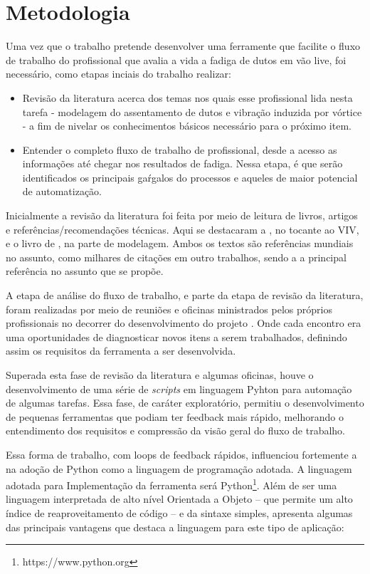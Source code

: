 \chapter{Metodologia}\label{chap:metodologia}


Uma vez que o trabalho pretende desenvolver uma ferramente que facilite o fluxo de trabalho do profissional que avalia a vida a fadiga de dutos em vão live, foi necessário, como etapas inciais do trabalho realizar:

\begin{itemize}
    \item Revisão da literatura acerca dos temas nos quais esse profissional lida nesta tarefa - modelagem do assentamento de dutos e vibração induzida por vórtice - a fim de nivelar os conhecimentos básicos necessário para o próximo item.
    \item Entender o completo fluxo de trabalho de profissional, desde a acesso as informações até chegar nos resultados de fadiga. Nessa etapa, é que serão identificados os principais gaŕgalos do processos e aqueles de maior potencial de automatização.
\end{itemize}

Inicialmente a revisão da literatura foi feita por meio de leitura de livros, artigos e referências/recomendações técnicas.
Aqui se destacaram a , no tocante ao VIV, e o livro de , na parte de modelagem.
Ambos os textos são referências mundiais no assunto, como milhares de citações em outro trabalhos, sendo a  a principal referência no assunto que se propõe.

A etapa de análise do fluxo de trabalho, e parte da etapa de revisão da literatura, foram realizadas por meio de reuniões e oficinas ministrados pelos próprios profissionais no decorrer do desenvolvimento do projeto \integrispan.
Onde cada encontro era uma oportunidades de diagnosticar novos itens a serem trabalhados, definindo assim os requisitos da ferramenta a ser desenvolvida.

Superada esta fase de revisão da literatura e algumas oficinas, houve o desenvolvimento de uma série de \textit{scripts} em linguagem Pyhton para automação de algumas tarefas.
Essa fase, de caráter exploratório, permitiu o desenvolvimento de pequenas ferramentas que podiam ter feedback mais rápido, melhorando o entendimento dos requisitos e compressão da visão geral do fluxo de trabalho.

Essa forma de trabalho, com loops de feedback rápidos, influenciou fortemente a na adoção de Python como a linguagem de programação adotada.
A linguagem adotada para Implementação da ferramenta será Python\footnote{https://www.python.org}.
Além de ser uma linguagem interpretada de alto nível Orientada a Objeto -- que permite um alto índice de reaproveitamento de código -- e da sintaxe simples,  apresenta algumas das principais vantagens que destaca a linguagem para este tipo de aplicação:


